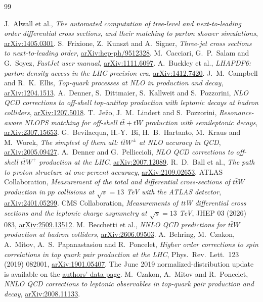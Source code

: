 \documentclass[11pt,a4paper]{article}
\begin{document}
\begin{thebibliography}{99}
\raggedright
{}
J.~Alwall et al.,
\emph{The automated computation of tree-level and next-to-leading order
differential cross sections, and their matching to parton shower simulations},
\href{https://arxiv.org/abs/1405.0301}{arXiv:1405.0301}.
S.~Frixione, Z.~Kunszt and A.~Signer,
\emph{Three-jet cross sections to next-to-leading order},
\href{https://arxiv.org/abs/hep-ph/9512328}{arXiv:hep-ph/9512328}.
M.~Cacciari, G.~P.~Salam and G.~Soyez,
\emph{FastJet user manual},
\href{https://arxiv.org/abs/1111.6097}{arXiv:1111.6097}.
A.~Buckley et al.,
\emph{LHAPDF6: parton density access in the LHC precision era},
\href{https://arxiv.org/abs/1412.7420}{arXiv:1412.7420}.
J.~M.~Campbell and R.~K.~Ellis,
\emph{Top-quark processes at NLO in production and decay},
\href{https://arxiv.org/abs/1204.1513}{arXiv:1204.1513}.
A.~Denner, S.~Dittmaier, S.~Kallweit and S.~Pozzorini,
\emph{NLO QCD corrections to off-shell top-antitop production with leptonic
decays at hadron colliders},
\href{https://arxiv.org/abs/1207.5018}{arXiv:1207.5018}.
T.~Je\v{z}o, J.~M.~Lindert and S.~Pozzorini,
\emph{Resonance-aware NLOPS matching for off-shell $t\bar t+tW$
production with semileptonic decays},
\href{https://arxiv.org/abs/2307.15653}{arXiv:2307.15653}.
G.~Bevilacqua, H.-Y.~Bi, H.~B.~Hartanto, M.~Kraus and M.~Worek,
\emph{The simplest of them all: $t\bar tW^\pm$ at NLO accuracy in QCD},
\href{https://arxiv.org/abs/2005.09427}{arXiv:2005.09427}.
A.~Denner and G.~Pelliccioli,
\emph{NLO QCD corrections to off-shell $t\bar tW^+$ production at the LHC},
\href{https://arxiv.org/abs/2007.12089}{arXiv:2007.12089}.
R.~D.~Ball et al.,
\emph{The path to proton structure at one-percent accuracy},
\href{https://arxiv.org/abs/2109.02653}{arXiv:2109.02653}.
ATLAS Collaboration,
\emph{Measurement of the total and differential cross-sections of
$t\bar tW$ production in $pp$ collisions at $\sqrt{s}=13$ TeV with the
ATLAS detector},
\href{https://arxiv.org/abs/2401.05299}{arXiv:2401.05299}.
CMS Collaboration,
\emph{Measurements of ttW differential cross sections and the leptonic charge
asymmetry at $\sqrt{s}=13$ TeV}, JHEP 03 (2026) 083,
\href{https://arxiv.org/abs/2509.13512}{arXiv:2509.13512}.
M.~Becchetti et al.,
\emph{NNLO QCD predictions for $t\bar tW$ production at hadron colliders},
\href{https://arxiv.org/abs/2606.09503}{arXiv:2606.09503}.
A.~Behring, M.~Czakon, A.~Mitov, A.~S.~Papanastasiou and R.~Poncelet,
\emph{Higher order corrections to spin correlations in top quark pair
production at the LHC}, Phys.\ Rev.\ Lett.\ 123 (2019) 082001,
\href{https://arxiv.org/abs/1901.05407}{arXiv:1901.05407}.
The June 2019 normalized-distribution update is available on the
\href{https://www.precision.hep.phy.cam.ac.uk/results/ttbar-decay/}{authors' data page}.
M.~Czakon, A.~Mitov and R.~Poncelet,
\emph{NNLO QCD corrections to leptonic observables in top-quark pair
production and decay},
\href{https://arxiv.org/abs/2008.11133}{arXiv:2008.11133}.
\end{thebibliography}
\end{document}
